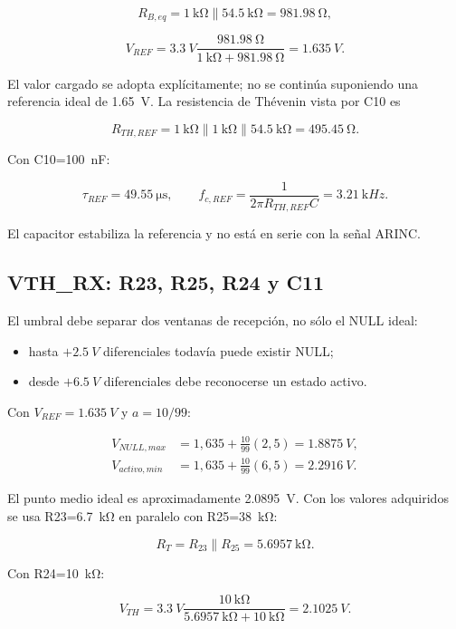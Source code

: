\documentclass[11pt,a4paper]{article}
\begin{document}
\[
 R_{B,eq}=\SI{1}{\kilo\ohm}\parallel\SI{54.5}{\kilo\ohm}
 =\SI{981.98}{\ohm},
\]

\[
 V_{REF}=\SI{3.3}{V}
 \frac{\SI{981.98}{\ohm}}
 {\SI{1}{\kilo\ohm}+\SI{981.98}{\ohm}}
 =\SI{1.635}{V}.
\]

El valor cargado se adopta explícitamente; no se continúa suponiendo una
referencia ideal de \SI{1.65}{V}. La resistencia de Thévenin vista por C10 es

\[
 R_{TH,REF}=\SI{1}{\kilo\ohm}\parallel\SI{1}{\kilo\ohm}
 \parallel\SI{54.5}{\kilo\ohm}=\SI{495.45}{\ohm}.
\]

Con C10=\SI{100}{\nano\farad}:

\[
 \tau_{REF}=\SI{49.55}{\micro\second},\qquad
 f_{c,REF}=\frac{1}{2\pi R_{TH,REF}C}=\SI{3.21}{\kilo Hz}.
\]

El capacitor estabiliza la referencia y no está en serie con la señal ARINC.

\subsection{VTH\_RX: R23, R25, R24 y C11}

El umbral debe separar dos ventanas de recepción, no sólo el NULL ideal:

\begin{itemize}
  \item hasta $+\SI{2.5}{V}$ diferenciales todavía puede existir NULL;
  \item desde $+\SI{6.5}{V}$ diferenciales debe reconocerse un estado activo.
\end{itemize}

Con $V_{REF}=\SI{1.635}{V}$ y $a=10/99$:

\begin{align*}
 V_{NULL,max}&=1{,}635+\frac{10}{99}(2{,}5)=\SI{1.8875}{V},\\
 V_{activo,min}&=1{,}635+\frac{10}{99}(6{,}5)=\SI{2.2916}{V}.
\end{align*}

El punto medio ideal es aproximadamente \SI{2.0895}{V}. Con los valores
adquiridos se usa R23=\SI{6.7}{\kilo\ohm} en paralelo con
R25=\SI{38}{\kilo\ohm}:

\[
 R_T=R_{23}\parallel R_{25}=\SI{5.6957}{\kilo\ohm}.
\]

Con R24=\SI{10}{\kilo\ohm}:

\[
 V_{TH}=\SI{3.3}{V}
 \frac{\SI{10}{\kilo\ohm}}
 {\SI{5.6957}{\kilo\ohm}+\SI{10}{\kilo\ohm}}
 =\SI{2.1025}{V}.
\]
\end{document}
